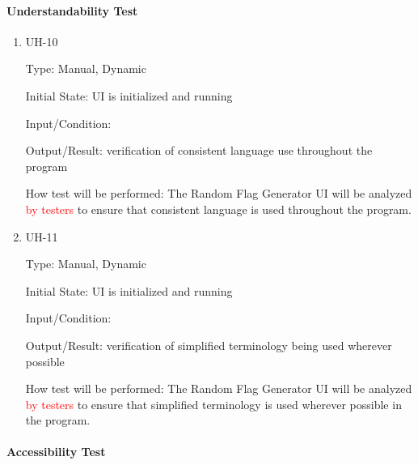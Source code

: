 \documentclass[12pt, titlepage]{article}
\begin{document}
\paragraph{Understandability Test}

\begin{enumerate}

\item{UH-10\\}

Type: Manual, Dynamic

Initial State: UI is initialized and running

Input/Condition: 

Output/Result: verification of consistent language use throughout the program

How test will be performed: The Random Flag Generator UI will be analyzed
\textcolor{red}{by testers} to ensure that consistent language is used
throughout the program.

\item{UH-11\\}

Type: Manual, Dynamic

Initial State: UI is initialized and running

Input/Condition: 

Output/Result: verification of simplified terminology being used wherever
possible

How test will be performed: The Random Flag Generator UI will be analyzed
\textcolor{red}{by testers} to ensure that simplified terminology is used
wherever possible in the program.

\end{enumerate}

\paragraph{Accessibility Test}
\end{document}
